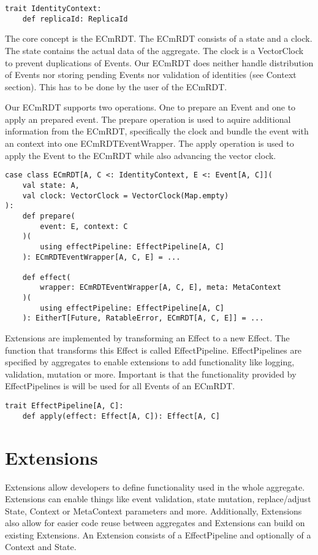 \documentclass[
	ngerman,
	ruledheaders=section,   %
	class=report,		    %
	thesis={type=bachelor}, %
	accentcolor=9c,			%
	custommargins=true,    %
	marginpar=false,        %
	parskip=half-,          %
	fontsize=11pt,          %
]{tudapub}
\begin{document}
\begin{lstlisting}
trait IdentityContext:
	def replicaId: ReplicaId
\end{lstlisting}

The core concept is the ECmRDT. The ECmRDT consists of a state and a clock. The state contains the actual data of the aggregate. The clock is a VectorClock to prevent duplications of Events. Our ECmRDT does neither handle distribution of Events nor storing pending Events nor validation of identities (see Context section). This has to be done by the user of the ECmRDT.

Our ECmRDT supports two operations. One to prepare an Event and one to apply an prepared event. The prepare operation is used to aquire additional information from the ECmRDT, specifically the clock and bundle the event with an context into one ECmRDTEventWrapper. The apply operation is used to apply the Event to the ECmRDT while also advancing the vector clock.

\begin{lstlisting}
case class ECmRDT[A, C <: IdentityContext, E <: Event[A, C]](
	val state: A,
	val clock: VectorClock = VectorClock(Map.empty)
):
	def prepare(
		event: E, context: C
	)(
		using effectPipeline: EffectPipeline[A, C]
	): ECmRDTEventWrapper[A, C, E] = ...

	def effect(
		wrapper: ECmRDTEventWrapper[A, C, E], meta: MetaContext
	)(
		using effectPipeline: EffectPipeline[A, C]
	): EitherT[Future, RatableError, ECmRDT[A, C, E]] = ...
\end{lstlisting}

Extensions are implemented by transforming an Effect to a new Effect. The function that transforms this Effect is called EffectPipeline. EffectPipelines are specified by aggregates to enable extensions to add functionality like logging, validation, mutation or more. Important is that the functionality provided by EffectPipelines is will be used for all Events of an ECmRDT. 

\begin{lstlisting}
trait EffectPipeline[A, C]:
	def apply(effect: Effect[A, C]): Effect[A, C]
\end{lstlisting}

\section{Extensions}
Extensions allow developers to define functionality used in the whole aggregate. Extensions can enable things like event validation, state mutation, replace/adjust State, Context or MetaContext parameters and more. Additionally, Extensions also allow for easier code reuse between aggregates and Extensions can build on existing Extensions. An Extension consists of a EffectPipeline and optionally of a Context and State. 
\end{document}
